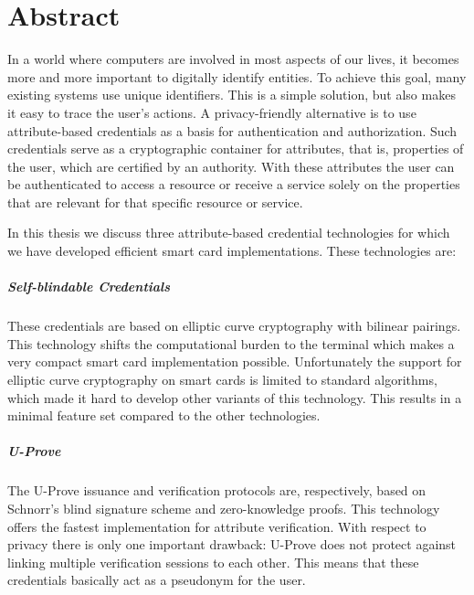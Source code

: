 \chapter*{Abstract}

In a world where computers are involved in most aspects of our lives, it
becomes more and more important to digitally identify entities. To achieve 
this goal, many existing systems use unique identifiers. This is a simple
solution, but also makes it easy to trace the user's actions. A 
privacy-friendly alternative is to use attribute-based credentials as a 
basis for authentication and authorization. Such credentials serve as a 
cryptographic container for attributes, that is, properties of the user,
which are certified by an authority. With these attributes the user can 
be authenticated to access a resource or receive a service solely on the 
properties that are relevant for that specific resource or service.

In this thesis we discuss three attribute-based credential technologies 
for which we have developed efficient smart card implementations. These 
technologies are:

\paragraph{Self-blindable Credentials}
These credentials are based on elliptic curve cryptography with bilinear 
pairings. This technology shifts the computational burden to the terminal 
which makes a very compact smart card implementation possible. 
Unfortunately the support for elliptic curve cryptography on smart cards 
is limited to standard algorithms, which made it hard to develop other 
variants of this technology. This results in a minimal feature set 
compared to the other technologies.

\paragraph{U-Prove}
The U-Prove issuance and verification protocols are, respectively, based 
on Schnorr's blind signature scheme and zero-knowledge proofs. This 
technology offers the fastest implementation for attribute verification. 
With respect to privacy there is only one important drawback: U-Prove 
does not protect against linking multiple verification sessions to each 
other. This means that these credentials basically act as a pseudonym for 
the user.

